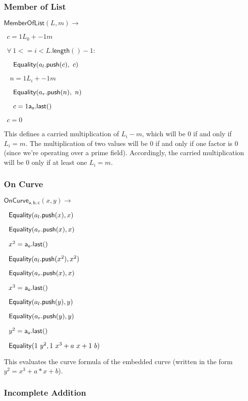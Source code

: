 \documentclass[]{article}
\begin{document}
\subsubsection{Member of List}

\newcommand{\memberlist}{\mathsf{MemberOfList}}

$\memberlist(L, m) \rightarrow$

$~~c = 1 L_0 + -1 m$

$~~\forall ~1 <= i < L\mathsf{.length}() - 1:$

$~~~~\mathsf{Equality}(a_l\mathsf{.push}(c), ~c)$

$~~~~n = 1 L_i + -1 m$

$~~~~\mathsf{Equality}(a_r\mathsf{.push}(n), ~n)$

$~~~~c = 1 \mathsf{a_o.last()}$

$~~c = 0$

This defines a carried multiplication of $L_i - m$, which will be $0$ if and only if $L_i = m$. The multiplication of two values will be $0$ if and only if one factor is $0$ (since we're operating over a prime field). Accordingly, the carried multiplication will be $0$ only if at least one $L_i = m$.

\newpage

\subsubsection{On Curve}

\newcommand{\oncurve}{\mathsf{OnCurve_{a,b,c}}}

$\oncurve(x, y) \rightarrow$

$~~\mathsf{Equality}(a_l\mathsf{.push}(x), x)$

$~~\mathsf{Equality}(a_r\mathsf{.push}(x), x)$

$~~x^2 = \mathsf{a_o.last()}$

$~~\mathsf{Equality}(a_l\mathsf{.push}(x^2), x^2)$

$~~\mathsf{Equality}(a_r\mathsf{.push}(x), x)$

$~~x^3 = \mathsf{a_o.last()}$

$~~\mathsf{Equality}(a_l\mathsf{.push}(y), y)$

$~~\mathsf{Equality}(a_r\mathsf{.push}(y), y)$

$~~y^2 = \mathsf{a_o.last()}$

$~~\mathsf{Equality}(1 ~y^2, 1 ~x^3 + a ~x + 1 ~b)$

This evaluates the curve formula of the embedded curve (written in the form $y^2 = x^3 + a * x + b$).

\subsubsection{Incomplete Addition}
\end{document}
